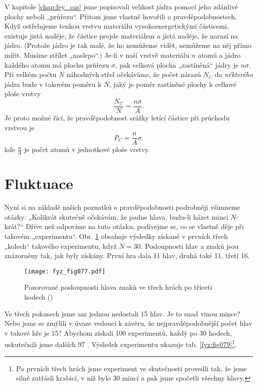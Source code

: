     V kapitole \ref{chap:fey_cas} jsme popisovali velikost jádra pomocí jeho zdánlivé plochy neboli 
    „průřezu“. Přitom jsme vlastně hovořili o pravděpodobnostech. Když ostřelujeme tenkou vrstvu 
    materiálu vysokoenergetickými částicemi, existuje jistá naděje, že částice projde materiálem a 
    jistá naděje, že narazí na jádro. (Protože jádro je tak malé, že ho nemůžeme vidět, nemůžeme na 
    něj přímo mířit. Musíme střílet „naslepo“.) Je-li v naší vrstvě materiálu \(n\) atomů a jádro 
    každého atomu má plochu průřezu \(\sigma\), pak celková plocha „zastíněná“ jádry je 
    \(n\sigma\). Při velkém počtu \(N\) náhodných střel očekáváme, že počet nárazů \(N_C\) do 
    \emph{některého} jádra bude v takovém poměru k \(N\), jaký je poměr zastíněné plochy k celkové 
    ploše vrstvy
    \begin{equation}\label{fyz:eq072}
      \frac{N_C}{N} = \frac{n\sigma}{A}.
    \end{equation}
    Je proto možné říci, že pravděpodobnost srážky letící částice při průchodu vrstvou je
    \begin{equation}\label{fyz:eq073}
      P_C = \frac{n}{A}\sigma.
    \end{equation}
    kde \(\frac{n}{A}\) je počet atomů v jednotkové ploše vrstvy.
    
  \section{Fluktuace}
    Nyní si na základě našich poznatků o pravděpodobnosti podrobněji všimneme otázky: „Kolikrát 
    skutečně očekávám, že padne hlava, budu-li házet minci \(N\)- krát?“ Dříve než odpovíme na tuto 
    otázku, podívejme se, co se vlastně děje při takovém „experimentu“. Obr. \ref{fyz:fig077} 
    obsahuje výsledky získané v prvních třech „kolech“ takového experimentu, když \(N= 30\). 
    Posloupnosti hlav a znaků jsou znázorněny tak, jak byly získány. První hra dala \num{11} hlav, 
    druhá také \num{11}, třetí \num{16}.
    
    \begin{figure}[ht!]  %
      \centering
      \texttt{[image: fyz\_fig077.pdf]}
      \caption{Pozorované posloupnosti hlava znaků ve třech hrách po třiceti hodech 
              (\cite[s.~79]{Feynman01})}
      \label{fyz:fig077}
    \end{figure}
    Ve třech pokusech jsme ani jednou nedostali \num{15} hlav. Je to snad vinou mince? Nebo jsme se 
    zmýlili v úvaze vedoucí k závěru, že nejpravděpodobnější počet hlav v takové hře je \num{15}? 
    Abychom získali \num{100} experimentů, každý po \num{30} hodech, uskutečnili jsme dalších 
    \num{97} . Výsledek experimentu ukazuje tab. \ref{fyz:fig079}\footnote{Po prvních třech 
    hrách jsme experiment ve skutečnosti provedli tak, že jsme silně zatřásli krabicí, v níž bylo 
    \num{30} mincí a pak jsme spočetli všechny hlavy.}.
    
